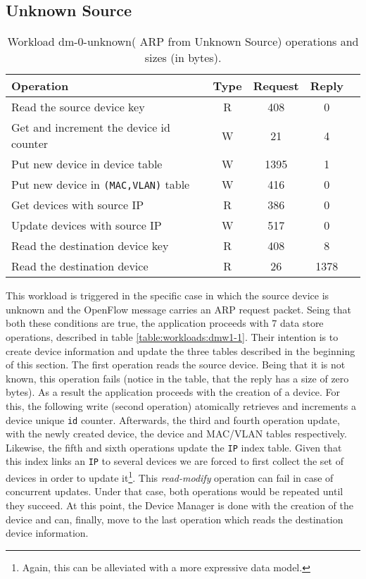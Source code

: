 \subsection{Unknown Source}
\begin{table}[H]
\centering 
\begin{tabular}{l c c c c}

 Operation & Type & Request & Reply \\ \toprule 

 Read the source device key & R & 408 & 0\\\midrule
Get and increment the device id counter & W & 21 & 4\\\midrule
Put new device in device table & W & 1395 & 1\\\midrule
Put new device in \texttt{(MAC,VLAN)} table & W & 416 & 0\\\midrule
Get devices with source IP & R & 386 & 0\\\midrule
Update devices with source IP & W & 517 & 0\\\midrule
Read the destination device key & R & 408 & 8\\\midrule
Read the destination device & R & 26 & 1378 \\\bottomrule
\end{tabular}
\caption[Workload dm-0-unknown( ARP from Unknown Source)
operations]{Workload dm-0-unknown( ARP from Unknown Source) operations
  and sizes (in bytes).}
\end{table}


This workload is triggered in the specific case in which  the source device
is unknown and the OpenFlow message carries an ARP request
packet. Seing that both these  conditions are true, the application
proceeds  with 7 data store operations, described in table
\ref{table:workloads:dmw1-1}. Their intention is to  create device
information and update the three tables described  in the beginning
of this section.  The first operation reads the  source device. Being
that it  is not known, this operation fails (notice in the table, that
the reply has a size  of zero bytes). As a result the application
proceeds with the creation of a device. For this, the
following write (second operation) atomically retrieves
 and increments a device
unique \texttt{id} counter. Afterwards, the third and fourth  operation
update, with the newly created device, the device and MAC/VLAN
tables respectively. Likewise, the fifth and sixth operations update
the \texttt{IP} index table. Given that this index links an \texttt{IP} to
several devices we are forced to first collect the set of devices in
order to update it\footnote{Again, this can be alleviated with a more
  expressive data model.}. This \emph{read-modify} operation can
fail in case of concurrent updates. Under that case, both operations
would be repeated until they succeed. At this point, the Device Manager
is done with the creation of the device and can, finally, move to the
last operation which reads the destination device information. 

